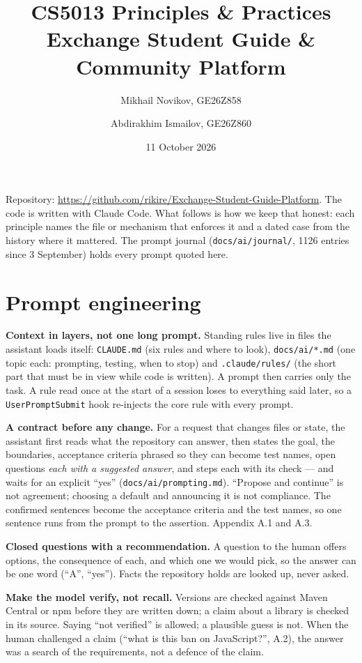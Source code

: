 \documentclass[11pt]{article}
\title{\vspace{-3em}CS5013 Principles \& Practices\\[0.2em]
\large Exchange Student Guide \& Community Platform}
\author{Mikhail Novikov, GE26Z858 \and Abdirakhim Ismailov, GE26Z860}
\date{\vspace{-0.6em}11 October 2026}
\begin{document}
\sloppy
\maketitle
\vspace{-2.2em}

\noindent Repository: \url{https://github.com/rikire/Exchange-Student-Guide-Platform}. The code is
written with Claude Code. What follows is how we keep that honest: each principle names the file or
mechanism that enforces it and a dated case from the history where it mattered. The prompt journal
(\texttt{docs/ai/journal/}, 1126 entries since 3 September) holds every prompt quoted here.

\section{Prompt engineering}

\textbf{Context in layers, not one long prompt.} Standing rules live in files the assistant loads
itself: \texttt{CLAUDE.md} (six rules and where to look), \texttt{docs/ai/*.md} (one topic each:
prompting, testing, when to stop) and \texttt{.claude/rules/} (the short part that must be in view
while code is written). A prompt then carries only the task. A rule read once at the start of a
session loses to everything said later, so a \texttt{UserPromptSubmit} hook re-injects the core
rule with every prompt.

\textbf{A contract before any change.} For a request that changes files or state, the assistant
first reads what the repository can answer, then states the goal, the boundaries, acceptance criteria
phrased so they can become test names, open questions \emph{each with a suggested answer}, and steps
each with its check --- and waits for an explicit ``yes'' (\texttt{docs/ai/prompting.md}). ``Propose
and continue'' is not agreement; choosing a default and announcing it is not compliance. The
confirmed sentences become the acceptance criteria and the test names, so one sentence runs from
the prompt to the assertion. Appendix A.1 and A.3.

\textbf{Closed questions with a recommendation.} A question to the human offers options, the
consequence of each, and which one we would pick, so the answer can be one word (``A'', ``yes'').
Facts the repository holds are looked up, never asked.

\textbf{Make the model verify, not recall.} Versions are checked against Maven Central or npm before
they are written down; a claim about a library is checked in its source. Saying ``not verified'' is
allowed; a plausible guess is not. When the human challenged a claim (``what is this ban on
JavaScript?'', A.2), the answer was a search of the requirements, not a defence of the claim.
\end{document}
